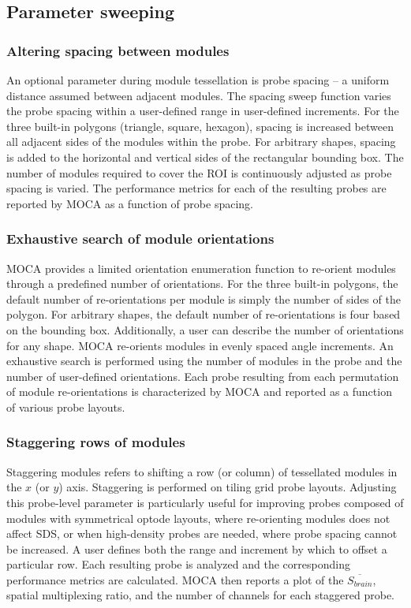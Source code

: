 \subsection{Parameter sweeping}
\subsubsection{Altering spacing between modules}
An optional parameter during module tessellation is probe spacing -- a uniform distance assumed between adjacent modules. The spacing sweep function varies the probe spacing within a user-defined range in user-defined increments. For the three built-in polygons (triangle, square, hexagon), spacing is increased between all adjacent sides of the modules within the probe. For arbitrary shapes, spacing is added to the horizontal and vertical sides of the rectangular bounding box. The number of modules required to cover the ROI is continuously adjusted as probe spacing is varied. The performance metrics for each of the resulting probes are reported by MOCA as a function of probe spacing.

\subsubsection{Exhaustive search of module orientations}
MOCA provides a limited orientation enumeration function to re-orient modules through a predefined number of orientations. For the three built-in polygons, the default number of re-orientations per module is simply the number of sides of the polygon. For arbitrary shapes, the default number of re-orientations is four based on the bounding box. Additionally, a user can describe the number of orientations for any shape. MOCA re-orients modules in evenly spaced angle increments. An exhaustive search is performed using the number of modules in the probe and the number of user-defined orientations. Each probe resulting from each permutation of module re-orientations is characterized by MOCA and reported as a function of various probe layouts.

\subsubsection{Staggering rows of modules}
Staggering modules refers to shifting a row (or column) of tessellated modules in the $x$ (or $y$) axis. Staggering is performed on tiling grid probe layouts. Adjusting this probe-level parameter is particularly useful for improving probes composed of modules with symmetrical optode layouts, where re-orienting modules does not affect SDS, or when high-density probes are needed, where probe spacing cannot be increased. A user defines both the range and increment by which to offset a particular row. Each resulting probe is analyzed and the corresponding performance metrics are calculated. MOCA then reports a plot of the $\overline{S_{brain}}$, spatial multiplexing ratio, and the number of channels for each staggered probe.


